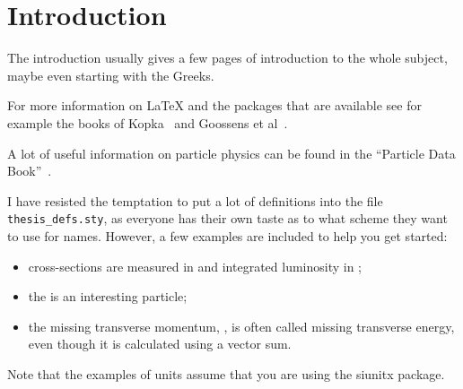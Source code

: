 \chapter{Introduction}
\label{sec:intro}

The introduction usually gives a few pages of introduction to the
whole subject, maybe even starting with the Greeks.

For more information on \LaTeX{} and the packages that are available
see for example the books of Kopka~\citep{kopka04} and Goossens et
al~\citep{goossens04}.

A lot of useful information on particle physics can be found in the
\enquote{Particle Data Book}~\citep{pdg2010}.

I have resisted the temptation to put a lot of definitions into the
file \texttt{thesis\_defs.sty}, as everyone has their own taste as
to what scheme they want to use for names. However, a few examples
are included to help you get started:
\begin{itemize}
\setlength{\itemsep}{0pt}\setlength{\parskip}{0pt}
\item cross-sections are measured in \si{\pb} and integrated
  luminosity in \si{\invpb};
\item the \KoS is an interesting particle;
\item the missing transverse momentum, \pTmiss, is often called
  missing transverse energy, even though it is calculated using a vector sum.
\end{itemize}
Note that the examples of units assume that you are using the
\textsf{siunitx} package.

